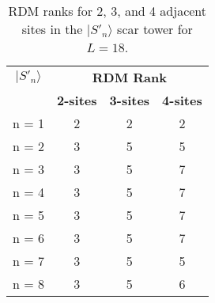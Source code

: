 \documentclass[11pt]{article}
\begin{document}
\begin{itemize}
\begin{itemize}
	 \begin{table}[h]
	\centering
	\begin{tabular}{|c|ccc|}
	\hline
	\textbf{$|S'_n\rangle$} & \multicolumn{3}{c|}{\textbf{RDM Rank}} \\
	\cline{2-4}
	& \textbf{2-sites} & \textbf{3-sites} & \textbf{4-sites} \\
	\hline
	 n = 1 & 2 & 2 & 2 \\
	 n = 2 & 3 & 5 & 5 \\
	 n = 3 & 3 & 5 & 7 \\
	 n = 4 & 3 & 5 & 7 \\  
	 n = 5 & 3 & 5 & 7 \\
	 n = 6 & 3 & 5 & 7 \\
	 n = 7 & 3 & 5 & 5 \\
	 n = 8 & 3 & 5 & 6 \\
	\hline
	\end{tabular}
	\caption{RDM ranks for 2, 3, and 4 adjacent sites in the $|S'_n\rangle$ scar tower for $L=18$.}
	\label{tab:ranks2}
	\end{table}

\end{itemize}
\end{itemize}


\vspace{0.3cm}
\end{document}
